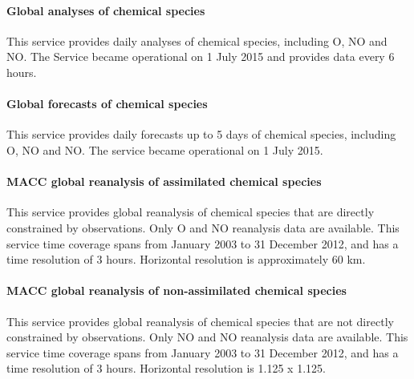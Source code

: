 \documentclass[9pt]{article}
\begin{document}
\paragraph{Global analyses of chemical species}\label{sec-global-analyses-of-chemical-species}%

\noindent{}This service provides daily analyses of chemical species, including O, NO and NO. 
The Service became operational on 1 July 2015 and provides data every 6 hours.%

\paragraph{Global forecasts of chemical species}\label{sec-global-forecasts-of-chemical-species}%

\noindent{}This service provides daily forecasts up to 5 days of chemical species, including O, NO and NO. 
The service became operational on 1 July 2015.%

\paragraph{MACC global reanalysis of assimilated chemical species}\label{sec-macc-global-reanalysis-of-assimilated-chemical-species}%

\noindent{}This service provides global reanalysis of chemical species that are directly constrained by observations.
Only O and NO reanalysis data are available. 
This service time coverage spans from January 2003 to 31 December 2012, and has a time resolution of 3 hours.
Horizontal resolution is approximately 60 km.%

\paragraph{MACC global reanalysis of non-assimilated chemical species}\label{sec-macc-global-reanalysis-of-non-assimilated-chemical-species}%

\noindent{}This service provides global reanalysis of chemical species that are not directly constrained by observations. 
Only NO and NO reanalysis data are available. 
This service time coverage spans from January 2003 to 31 December 2012, and has a time resolution of 3 hours.
Horizontal resolution is 1.125\textdegree{} x 1.125\textdegree{}.%
\end{document}
